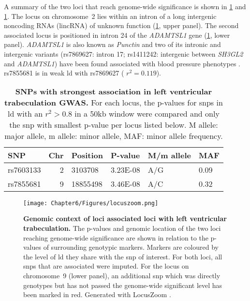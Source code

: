 %
\noindent A summary of the two loci that reach genome-wide significance is shown in \cref{tab:sig-FD} and \cref{fig:locuszoom-fd}. The locus on chromosome~2 lies within an intron of a long intergenic noncoding RNAs (lincRNA) of unknown function (\cref{fig:locuszoom-fd}, upper panel). The second associated locus is positioned in intron \num{24} of the \textit{ADAMTSL1} gene (\cref{fig:locuszoom-fd}, lower panel). \textit{ADAMTSL1} is also known as \textit{Punctin} and two of its intronic and intergenic variants  (rs7869627: intron \num{17}; rs1411242: intergenic between \textit{SH3GL2} and \textit{ADAMTSL1}) have been found associated with blood pressure phenotypes \citep{Sabatti2009}. rs7855681 is in weak \gls{ld} with rs7869627 ( \(r^2=0.119\)). 

\begin{table}[htbp]
  \centering
  \caption[\textbf{SNPs with strongest association in left ventricular trabeculation GWAS. }]{\textbf{SNPs with strongest association in left ventricular trabeculation GWAS. } For each locus, the p-values for \glspl{snp} in \gls{ld} with an \(r^2 > 0.8\) in a \num{50}kb window were compared and only the \gls{snp} with smallest p-value per locus listed below. M allele: major allele, m allele:  minor allele, MAF: minor allele frequency. }
    \begin{tabular}{lrllll}
    \toprule
    SNP   & \multicolumn{1}{l}{Chr} & Position & P-value & M/m allele & MAF \\
    \midrule
    rs7603133 & 2     & \num{3103708} & \num{3.23E-08} & A/G     & \num{0.09} \\
    rs7855681 & 9     & \num{18855498} & \num{3.46E-08} & A/C     & \num{0.32} \\
    \bottomrule
    \end{tabular}%
  \label{tab:sig-FD}%
\end{table}%
%
\begin{figure}[hbtp]
	\centering
	\texttt{[image: Chapter6/Figures/locuszoom.png]}
	\caption[\textbf{Genomic context of loci associated loci with left ventricular trabeculation. }]{\textbf{Genomic context of loci associated loci with left ventricular trabeculation.  }The p-values and genomic location of the two loci reaching genome-wide significance are shown in relation to the p-values of surrounding genotypic markers. Markers are coloured by the level of \gls{ld} they share with the \gls{snp} of interest. For both loci, all \glspl{snp} that are associated were imputed. For the locus on chromosome~9 (lower panel), an additional \gls{snp} which was directly genotypes but has not passed the genome-wide significant level has been marked in red. Generated with LocusZoom \citep{Pruim2010}.}  
	 	\label{fig:locuszoom-fd}
\end{figure}
